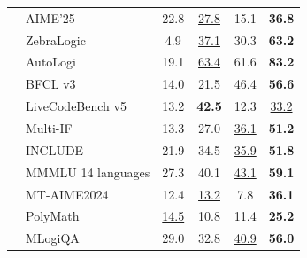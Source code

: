 \begin{table}[tbp]
{\begin{tabular}{@{}clcccc@{}}
& AIME'25 & 22.8 & \underline{27.8} & 15.1 & \textbf{36.8} \\
& ZebraLogic & 4.9 & \underline{37.1} & 30.3 & \textbf{63.2} \\
& AutoLogi & 19.1 & \underline{63.4} & 61.6 & \textbf{83.2} \\
\midrule
{} & BFCL v3 & 14.0 & 21.5 & \underline{46.4} & \textbf{56.6} \\
& LiveCodeBench v5 & 13.2 & \textbf{42.5} & 12.3 & \underline{33.2} \\
\midrule
{} & Multi-IF & 13.3 & 27.0 & \underline{36.1} & \textbf{51.2} \\
& INCLUDE & 21.9 & 34.5 & \underline{35.9} & \textbf{51.8} \\
& MMMLU {\tiny{14 languages}} & 27.3 & 40.1 & \underline{43.1} & \textbf{59.1} \\
& MT-AIME2024 & 12.4 & \underline{13.2} & 7.8 & \textbf{36.1} \\
& PolyMath & \underline{14.5} & 10.8 & 11.4 & \textbf{25.2} \\
& MLogiQA & 29.0 & 32.8 & \underline{40.9} & \textbf{56.0} \\
\bottomrule
\end{tabular}
}
\vspace{1mm}
\end{table}


